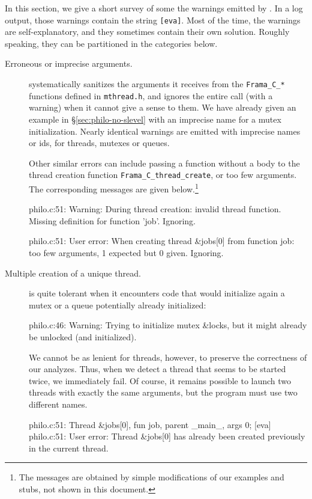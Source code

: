 \documentclass{frama-c-book}
\def\mysec#1{\S{\ref{sec:#1}}}
\begin{document}
In this section, we give a short survey of some the warnings emitted by
\mthread.  In a log output, those warnings contain the string
\verb+[eva]+.  Most of the time, the warnings are self-explanatory, and
they sometimes contain their own solution. Roughly speaking, they can
be partitioned in the categories below.
\begin{description}
\item[Erroneous or imprecise arguments.]
\mthread systematically sanitizes the arguments it receives from
the \verb+Frama_C_*+ functions defined in \verb+mthread.h+, and ignores the
entire call (with a warning) when it cannot give a sense to them.
%
We have already given an example in \mysec{philo-no-slevel} with an
imprecise name for a mutex initialization. Nearly identical warnings
are emitted with imprecise names or ids, for threads, mutexes or queues.

Other similar errors can include passing a function without a body to
the thread creation function
\verb+Frama_C_thread_create+, or too few arguments. The corresponding
messages are given below.\footnote{The messages are obtained by simple
modifications of our examples and stubs, not shown in this document.}
\begin{logs}
[eva] philo.c:51: Warning: During thread creation: invalid thread function.
                 Missing definition for function 'job'. Ignoring.
\end{logs}
\begin{logs}
[eva] philo.c:51: User error: When creating thread &jobs[0] from function
                 job: too few arguments, 1 expected but 0 given. Ignoring.
\end{logs}

\item[Multiple creation of a unique thread.]

\mthread is quite tolerant when it encounters code that would initialize
again a mutex or a queue potentially already initialized:
\begin{logs}
[eva] philo.c:46: Warning: Trying to initialize mutex &locks, but it might already be unlocked (and initialized).
\end{logs}

We cannot be as lenient for threads, however, to preserve the
correctness of our analyzes. Thus, when we detect a thread that seems
to be started twice, we immediately fail.  Of course, it remains
possible to launch two threads with exactly the same arguments, but
the program must use two different names.
\begin{logs}
 philo.c:51: Thread &jobs[0], fun job, parent _main_, args {0; }
[eva] philo.c:51: User error: Thread &jobs[0] has already been created
                 previously in the current thread.
\end{logs}




\end{description}
\end{document}
